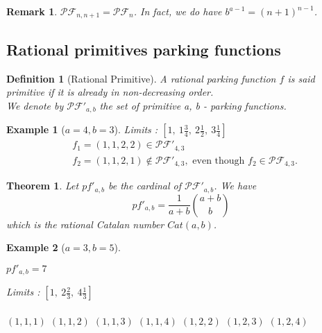 \documentclass[12pt]{report}
\newtheorem{theorem}{Theorem}
\newtheorem{definition}{Definition}
\newtheorem*{example}{Example}
\newtheorem*{rem}{Remark}
\begin{document}
\begin{rem}    
    $\mathcal{PF}_{n, n+1} = \mathcal{PF}_n$.
    In fact, we do have $b^{a-1} = (n+1)^{n-1}$.
\end{rem}

\subsection{Rational primitives parking functions}

\begin{definition}[Rational Primitive]
    A rational parking function $f$ is said
    \emph{primitive} if it is already in
    non-decreasing order.\\
    We denote by $\mathcal{PF'}_{a,b}$ the set of
    primitive a, b - parking functions.
\end{definition}

\begin{example}[$a = 4, b = 3$]
    Limits : $[1,\ 1 \frac{3}{4},\ 2 \frac{1}{2},\ 
    3 \frac{1}{4}]$
    \begin{align*}
        &f_1 = (1, 1, 2, 2) \in \mathcal{PF'}_{4,3}\\
        &f_2 = (1, 1, 2, 1) \notin \mathcal{PF'}_{4,3},
        \text{ even though } f_2 \in \mathcal{PF}_{4,3}.
    \end{align*}
\end{example}

\begin{theorem}
    Let $pf'_{a,b}$ be the cardinal of
    $\mathcal{PF'}_{a,b}$.
    We have $$\displaystyle pf'_{a,b} = 
    \frac{1}{a + b} \binom{a + b}{b}$$
    which is the \emph{rational Catalan number}
    $Cat(a,b)$.
\end{theorem}

\begin{example}[$a = 3, b = 5$]
    ~\\
    \begin{itemize*}
        \item $pf'_{a,b} = 7$
        \item Limits : $[1,\ 2 \frac{2}{3},\ 
            4 \frac{1}{3}]$\\\\
        \subitem $(1, 1, 1)$
        \subitem $(1, 1, 2)$
        \subitem $(1, 1, 3)$
        \subitem $(1, 1, 4)$
        \subitem $(1, 2, 2)$
        \subitem $(1, 2, 3)$
        \subitem $(1, 2, 4)$
    \end{itemize*}    
\end{example}
\end{document}
